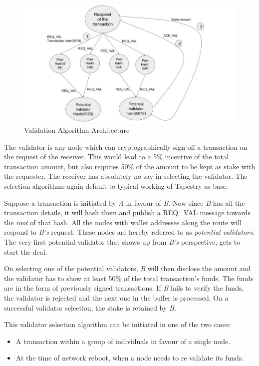\documentclass[conference,a4paper,12pt]{IEEEtran}
\begin{document}
	\begin{figure}
	  \includegraphics[width=\linewidth]{validation_algo.jpg}
	  \caption{Validation Algorithm Architecture}
	  \label{Validation Architecture}
	\end{figure}


	The validator is any node which can cryptographically sign off a transaction on the request of the receiver. This would lead to a 5\% incentive of the total transaction amount, but also requires 50\% of the amount to be kept as stake with the requester. The receiver has absolutely no say in selecting the validator. The selection algorithms again default to typical working of Tapestry \cite{tapestry_infra} as base.

	Suppose a transaction is initiated by \textit{A} in favour of \textit{B}. Now since \textit{B} has all the transaction details, it will hash them and publish a REQ\_VAL message towards the \textit{root} of that hash. All the nodes with wallet addresses along the route will respond to \textit{B's} request. These nodes are hereby referred to as \textit{potential validators}. The very first potential validator that shows up from \textit{B's} perspective, gets to start the deal.

	On selecting one of the potential validators, \textit{B} will then disclose the amount and the validator has to show at least 50\% of the total transaction's funds. The funds are in the form of previously signed transactions. If \textit{B} fails to verify the funds, the validator is rejected and the next one in the buffer is processed. On a successful validator selection, the stake is retained by \textit{B}.

	This validator selection algorithm can be initiated in one of the two cases:

	\begin{itemize}
    	\item A transaction within a group of individuals in favour of a single node.
	    \item At the time of network reboot, when a node needs to re validate its funds. 
	\end{itemize}
\end{document}
